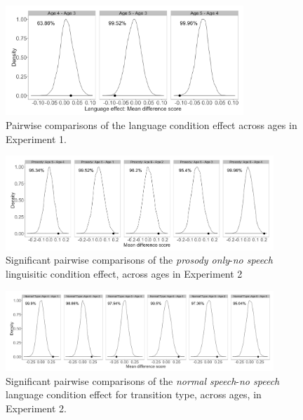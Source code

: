 \documentclass[authoryear, 12pt]{elsarticle}
\begin{document}
\begin{figure}[!htb]
\begin{center}
\includegraphics[width=0.8\textwidth]{figures/E1-child-randvsreal-ttest-agebylg.png}
\end{center}
\caption{Pairwise comparisons of the language condition effect across ages in Experiment 1.} 
\label{fig:E1-lgageinteraction}
\end{figure}

\begin{figure}[!htb]
\begin{center}
\includegraphics[width=0.9\textwidth]{figures/E2-child-randvsreal-ttest-muffledages.png}
\end{center}
\caption{Significant pairwise comparisons of the \textit{prosody only}-\textit{no speech} linguisitic condition effect, across ages in Experiment 2} 
\label{fig:E2-lgageinteraction}
\end{figure}

\begin{figure}[!htb]
\begin{center}
\includegraphics[width=0.9\textwidth]{figures/E2-child-randvsreal-ttest-normaltypesages.png}
\end{center}
\caption{Significant pairwise comparisons of the \textit{normal speech}-\textit{no speech} language condition effect for transition type, across ages, in Experiment 2.} 
\label{fig:E2-lgagetypeinteraction}
\end{figure}
\end{document}
